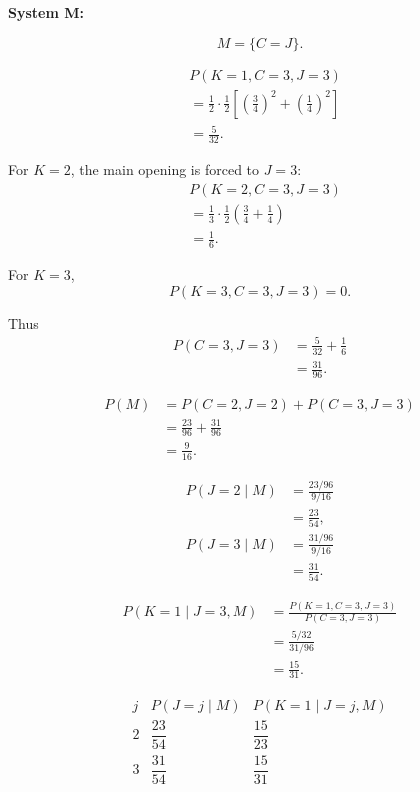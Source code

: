\documentclass[11pt,a4paper]{article}
\newcommand{\Prob}{P}
\begin{document}
\medskip
\textbf{System M:}

\[
M=\{C=J\}.
\]

\[
\begin{aligned}
&\Prob(K=1,C=3,J=3)\\
&=\frac12\cdot\frac12
\left[
\left(\frac34\right)^2+
\left(\frac14\right)^2
\right]\\
&=\frac5{32}.
\end{aligned}
\]

For $K=2$, the main opening is forced to $J=3$:
\[
\begin{aligned}
&\Prob(K=2,C=3,J=3)\\
&=\frac13\cdot\frac12
\left(\frac34+\frac14\right)\\
&=\frac16.
\end{aligned}
\]

For $K=3$,
\[
\Prob(K=3,C=3,J=3)=0.
\]

Thus
\[
\begin{aligned}
\Prob(C=3,J=3)
&=\frac5{32}+\frac16\\
&=\frac{31}{96}.
\end{aligned}
\]

\[
\begin{aligned}
\Prob(M)
&=\Prob(C=2,J=2)+\Prob(C=3,J=3)\\
&=\frac{23}{96}+\frac{31}{96}\\
&=\frac9{16}.
\end{aligned}
\]

\[
\begin{aligned}
\Prob(J=2\mid M)
&=\frac{23/96}{9/16}\\
&=\frac{23}{54},\\[6pt]
\Prob(J=3\mid M)
&=\frac{31/96}{9/16}\\
&=\frac{31}{54}.
\end{aligned}
\]

\[
\begin{aligned}
\Prob(K=1\mid J=3,M)
&=\frac{\Prob(K=1,C=3,J=3)}
{\Prob(C=3,J=3)}\\
&=\frac{5/32}{31/96}\\
&=\frac{15}{31}.
\end{aligned}
\]

\[
\begin{array}{c|cc}
j & \Prob(J=j\mid M)
& \Prob(K=1\mid J=j,M)\\
\hline
2 & \dfrac{23}{54} & \dfrac{15}{23}\\[6pt]
3 & \dfrac{31}{54} & \dfrac{15}{31}
\end{array}
\]
\end{document}

